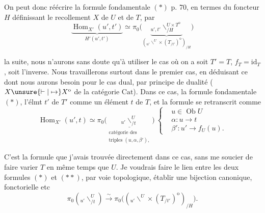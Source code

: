 On peut donc réécrire la formule fondamentale
$(*)$ p. 70, en termes du foncteur $H$ définissant
le recollement $X$ de $U$ et de $T$, par
\[
\boxed{\underbrace{\operatorname{Hom}_{X'}(u',t')}_{H'(u',t')}
\simeq\pi_0\bigl(\underbrace{{}_{u',t'}\backslash^{U\times T^{\mathrm o}}_{/H}}
_{({}_{u'}\backslash^{U}\times(T_{/t'})^{\mathrm o})_{/H}}\bigr)}\tag*{(*)}
\]

 la suite, nous n'aurons sans doute qu'à
utiliser le cas où on a soit $T'=T$, $f_T=\mathrm{id}_T$,
soit l'inverse. Nous travaillerons surtout dans
le premier cas, en déduisant ce dont nous
aurons besoin pour le cas dual, par principe de
dualité ( $X\unsure{\vdash|\mapsto}X^{\mathrm o}$ de la catégorie $\mathrm{Cat}$).
Dans ce cas,  la formule fondamentale $(*)$,  l'élmt
$t'$ de $T'$  comme un élément $t$ de $T$,
et la formule se retranscrit comme
\[
\boxed{\operatorname{Hom}_{X'}(u',t)\simeq
\pi_0\bigl(\underset{\substack{\text{catégorie des}\\\text{triples }(u,\alpha,\beta'),}}{\underline{{}_{u'}\backslash^{U}_{/t}}}\bigr)}
\ \left\{\begin{aligned}
&u\in\operatorname{Ob}U\\
&\alpha:u\to t\\
&\beta':u'\to f_U(u).
\end{aligned}\right.\tag*{(**)}
\]

C'est la formule que j'avais trouvée directement
dans ce cas, sans me soucier  de faire varier $T$
en même temps que $U$. Je voudrais faire le
lien entre les deux formules $(*)$ et $(**)$, par
voie topologique,  établir une bijection
canonique, fonctorielle etc
\[
\pi_0({}_{u'}\backslash^{U}_{/t})\mathrel{\overset{\sim}{\longrightarrow}}
\pi_0\bigl(({}_{u'}\backslash^{U}\times(T_{/t'})^{\mathrm o})_{/H}\bigr).
\]
